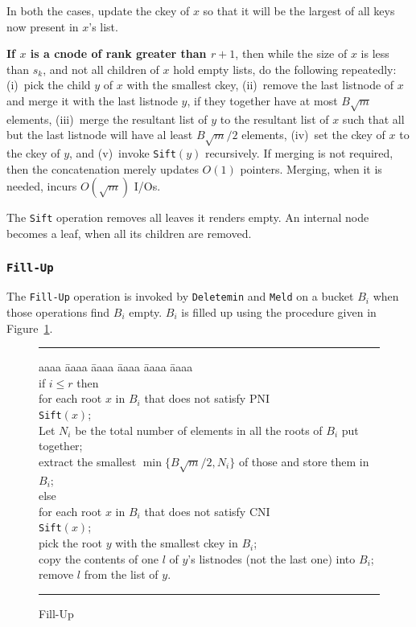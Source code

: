 In both the cases, update the ckey of $x$ so that it will be the largest of all keys now present in $x$'s list.
	
{\bf If $x$ is a cnode of rank greater than $r+1$}, then
	while the size of $x$ is less than $s_{k}$, and not all children of $x$ hold
	empty lists, do the following repeatedly: 
        (i)~pick the child $y$ of $x$ with the smallest ckey, (ii)~remove the last listnode 
	of $x$ and merge it with the last listnode $y$, if they together have at most
	$B\sqrt{m}$ elements, (iii)~merge the resultant list of $y$ to the resultant list of $x$ such that all but the last listnode will have al least $B \sqrt{m}/2$ elements,
	(iv)~set the ckey of $x$ to the ckey of $y$, and (v)~invoke {\tt Sift}$(y)$ recursively.
If merging is not required, then the concatenation merely updates $O(1)$ pointers.
Merging, when it is needed, incurs $O(\sqrt{m})$ I/Os.

The {\tt Sift} operation removes all leaves it renders empty.
An internal node becomes a leaf, when all its children are removed.

\subsubsection{{\tt Fill-Up}}
The {\tt Fill-Up} operation is invoked by {\tt Deletemin} and {\tt Meld} 
	on a bucket $B_{i}$ when those operations find $B_i$ empty.
$B_i$ is filled up using the procedure given in Figure~\ref{fig:fillup}.

\begin{figure}
\vspace{0.2in}
\hrule
\begin{tabbing}
aaaa \= aaaa \= aaaa \= aaaa \= aaaa \= aaaa \kill \\
if $i\leq r$ then \\
	\> for each root $x$ in $B_i$ that does not satisfy PNI \\
	\> 	\> {\tt Sift}$(x)$; \\
	\> Let $N_i$ be the total number of elements in all the roots of $B_i$ put together; \\
	\> extract the smallest $\min\{B\sqrt{m}/2,N_i\}$ of those and store them in $B_i$; \\
else \\
	\> for each root $x$ in $B_i$ that does not satisfy CNI \\
	\>	\> {\tt Sift}$(x)$; \\
	\> pick the root $y$ with the smallest ckey in $B_i$; \\
        \> copy the contents of one $l$ of $y$'s listnodes (not the last one) into $B_i$; \\
        \> remove $l$ from the list of $y$.
\end{tabbing}
\vspace{0.1in}
\hrule
\vspace{0.2in}
\caption{Fill-Up}
\label{fig:fillup}
\end{figure}

